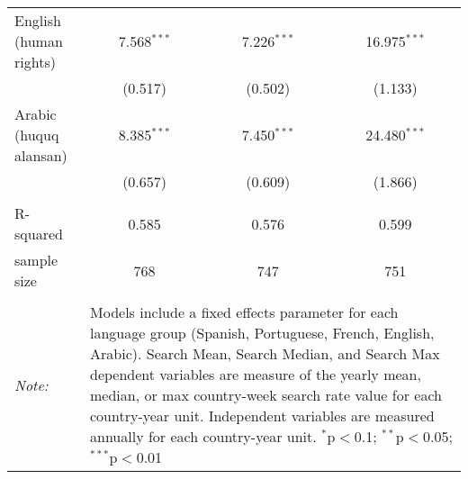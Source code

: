 \begin{table}[!htbp]
\begin{tabular}{@{\extracolsep{5pt}}lccc}
  English (human rights) & 7.568$^{***}$ & 7.226$^{***}$ & 16.975$^{***}$ \\ 
  & (0.517) & (0.502) & (1.133) \\ 
  Arabic (huquq alansan) & 8.385$^{***}$ & 7.450$^{***}$ & 24.480$^{***}$ \\ 
  & (0.657) & (0.609) & (1.866) \\ 
 \hline \\[-1.8ex] 
R-squared  & 0.585 & 0.576 & 0.599 \\ 
sample size  & 768 & 747 & 751 \\ 
\hline 
\hline \\[-1.8ex] 
\textit{Note:}  & \multicolumn{3}{l}{\parbox[t]{8cm}{Models include a fixed effects parameter for each language group (Spanish, Portuguese, French, English, Arabic). Search Mean, Search Median, and Search Max dependent variables are measure of the yearly mean, median, or max country-week search rate value for each country-year unit. Independent variables are measured annually for each country-year unit. $^{*}$p$<$0.1; $^{**}$p$<$0.05; $^{***}$p$<$0.01}} \\ 
\end{tabular} 
\end{table} 
